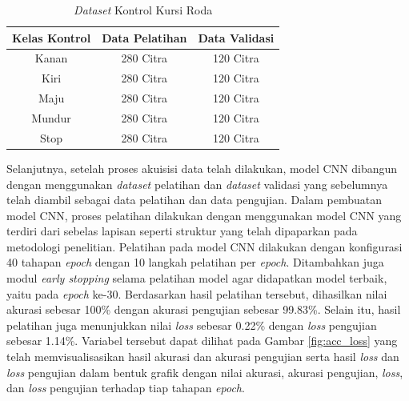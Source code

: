 \begin{longtable}{|c|c|c|}
  \caption{\emph{Dataset} Kontrol {Kursi Roda}}
  \label{tb:datadiagram} \\
  \hline
  \rowcolor[HTML]{C0C0C0}
  \textbf{Kelas Kontrol} & \textbf{Data Pelatihan} & \textbf{Data Validasi} \\ \hline
  Kanan            & 280 Citra               & 120 Citra               \\ \hline
  Kiri              & 280 Citra               & 120 Citra               \\ \hline
  Maju             & 280 Citra               & 120 Citra               \\ \hline
  Mundur            & 280 Citra               & 120 Citra               \\ \hline
  Stop             & 280 Citra               & 120 Citra               \\ \hline
\end{longtable}

Selanjutnya, setelah proses akuisisi data telah dilakukan, model CNN dibangun dengan menggunakan \emph{dataset} pelatihan dan \emph{dataset} validasi yang sebelumnya telah diambil sebagai data pelatihan dan data pengujian. Dalam pembuatan model CNN, proses pelatihan dilakukan dengan menggunakan model CNN yang terdiri dari sebelas lapisan seperti struktur yang telah dipaparkan pada metodologi penelitian. Pelatihan pada model CNN dilakukan dengan konfigurasi 40 tahapan \emph{epoch} dengan 10 langkah pelatihan per \emph{epoch}. Ditambahkan juga modul \emph{early stopping} selama pelatihan model agar didapatkan model terbaik, yaitu pada \emph{epoch} ke-30. Berdasarkan hasil pelatihan tersebut, dihasilkan nilai akurasi sebesar 100\% dengan akurasi pengujian sebesar 99.83\%. Selain itu, hasil pelatihan juga menunjukkan nilai \emph{loss} sebesar 0.22\% dengan \emph{loss} pengujian sebesar 1.14\%. Variabel tersebut dapat dilihat pada Gambar \ref{fig:acc_loss} yang telah memvisualisasikan hasil akurasi dan akurasi pengujian serta hasil \emph{loss} dan \emph{loss} pengujian dalam bentuk grafik dengan nilai akurasi, akurasi pengujian, \emph{loss}, dan \emph{loss} pengujian terhadap tiap tahapan \emph{epoch}.

